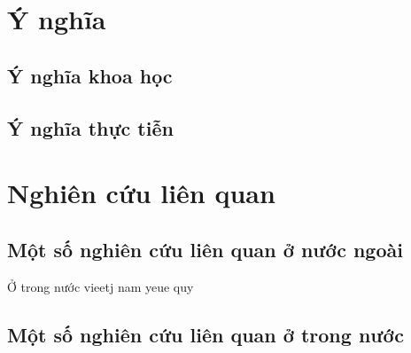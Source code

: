 \section{Ý nghĩa}
    \subsection{Ý nghĩa khoa học}

    \subsection{Ý nghĩa thực tiễn}





\section{Nghiên cứu liên quan}
	\subsection{Một số nghiên cứu liên quan ở nước ngoài}
	\noindent Ở trong nước vieetj nam yeue quy
	\subsection{Một số nghiên cứu liên quan ở trong nước}

